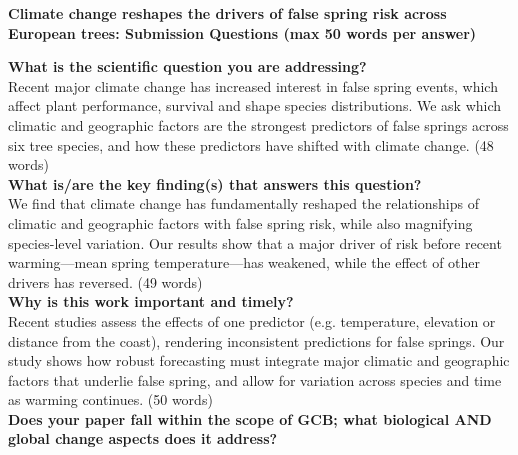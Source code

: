 \documentclass{article}\usepackage[]{graphicx}\usepackage[]{color}
\begin{document}
\nobibliography*
\noindent \textbf{\Large{Climate change reshapes the drivers of false spring risk across European trees: Submission Questions (max 50 words per answer)}}\\
\vspace{3ex}

\noindent \textbf{What is the scientific question you are addressing?} \\

\noindent  Recent major climate change has increased interest in false spring events, which affect plant performance, survival and shape species distributions. We ask which climatic and geographic factors are the strongest predictors of false springs across six tree species, and how these predictors have shifted with climate change.  (48 words) \\

\noindent \textbf{What is/are the key finding(s) that answers this question?} \\

\noindent We find that climate change has fundamentally reshaped the relationships of climatic and geographic factors with false spring risk, while also magnifying species-level variation.  Our results show that a major driver of risk before recent warming---mean spring temperature---has weakened, while the effect of other drivers has reversed. (49 words) \\ %


\noindent \textbf{Why is this work important and timely?}\\

\noindent Recent studies assess the effects of one predictor (e.g. temperature, elevation or distance from the coast), rendering inconsistent predictions for false springs. Our study shows how robust forecasting must integrate major climatic and geographic factors that underlie false spring, and allow for variation across species and time as warming continues.  (50 words) \\ %


\noindent \textbf{ Does your paper fall within the scope of GCB; what biological AND global change aspects does it address?}\\
\end{document}
